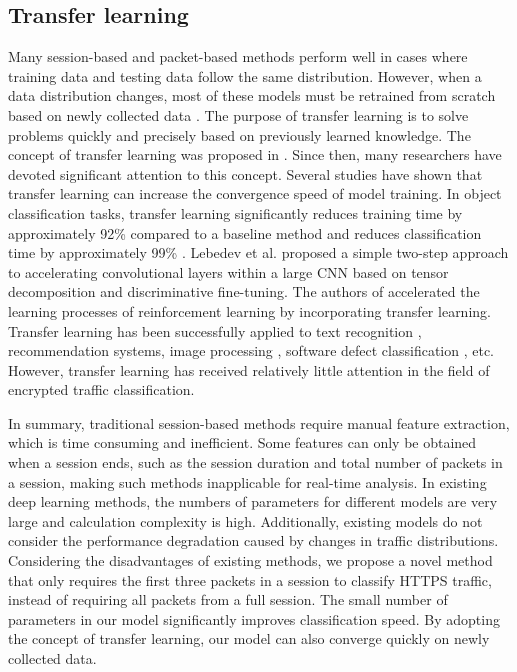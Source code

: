 \documentclass[preprint,12pt]{elsarticle}
\begin{document}
\subsection{Transfer learning} Many session-based and packet-based methods perform well in cases where training data and testing data follow the same distribution. However, when a data distribution changes, most of these models must be retrained from scratch based on newly collected data \cite{weiss2016survey}. The purpose of transfer learning is to solve problems quickly and precisely based on previously learned knowledge. The concept of transfer learning was proposed in \cite{Caruana:95}. Since then, many researchers have devoted significant attention to this concept. Several studies have shown that transfer learning can increase the convergence speed of model training. In object classification tasks, transfer learning significantly reduces training time by approximately 92\% compared to a baseline method and reduces classification time by approximately 99\% \cite{Kawewong}. Lebedev et al. \cite{lebedev2014speeding} proposed a simple two-step approach to accelerating convolutional layers within a large CNN based on tensor decomposition and discriminative fine-tuning. The authors of \cite{Takano} accelerated the learning processes of reinforcement learning by incorporating transfer learning. Transfer learning has been successfully applied to text recognition \cite{wang2011heterogeneous}, recommendation systems, image processing \cite{Eaton} \cite{Kulis} \cite{Zhu}, software defect classification \cite{nam2015heterogeneous}, etc. However, transfer learning has received relatively little attention in the field of encrypted traffic classification. 

In summary, traditional session-based methods require manual feature extraction, which is time consuming and inefficient. Some features can only be obtained when a session ends, such as the session duration and total number of packets in a session, making such methods inapplicable for real-time analysis. In existing deep learning methods, the numbers of parameters for different models are very large and calculation complexity is high. Additionally, existing models do not consider the performance degradation caused by changes in traffic distributions. Considering the disadvantages of existing methods, we propose a novel method that only requires the first three packets in a session to classify HTTPS traffic, instead of requiring all packets from a full session. The small number of parameters in our model significantly improves classification speed. By adopting the concept of transfer learning, our model can also converge quickly on newly collected data.
\end{document}

